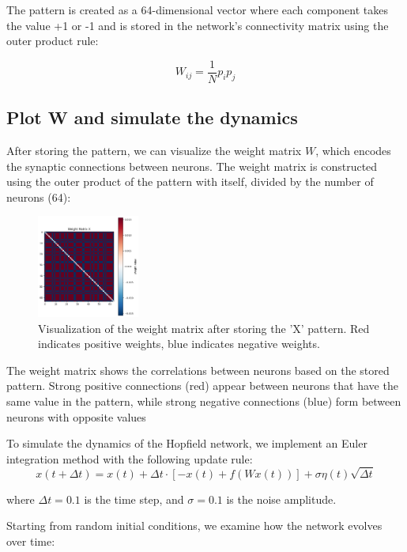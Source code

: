 \documentclass{article}
\begin{document}
The pattern is created as a 64-dimensional vector where each component takes the value +1 or -1 and is stored in the network's connectivity matrix using the outer product rule:

\begin{equation}
W_{ij} = \frac{1}{N}p_i p_j
\end{equation}

\subsection{Plot W and simulate the dynamics}
After storing the pattern, we can visualize the weight matrix $W$, which encodes the synaptic connections between neurons. The weight matrix is constructed using the outer product of the pattern with itself, divided by the number of neurons (64):

\begin{figure}[H]
\centering
\includegraphics[width=0.3\textwidth]{Weight Matrix X.png}
\caption{Visualization of the weight matrix after storing the 'X' pattern. Red indicates positive weights, blue indicates negative weights.}
\label{fig:weight_matrix}
\end{figure}

The weight matrix shows the correlations between neurons based on the stored pattern. Strong positive connections (red) appear between neurons that have the same value in the pattern, while strong negative connections (blue) form between neurons with opposite values

To simulate the dynamics of the Hopfield network, we implement an Euler integration method with the following update rule:
\begin{equation}
x(t+\Delta t) = x(t) + \Delta t \cdot [-x(t) + f(Wx(t))] + \sigma\eta(t)\sqrt{\Delta t}
\end{equation}

where $\Delta t = 0.1$ is the time step, and $\sigma = 0.1$ is the noise amplitude.

Starting from random initial conditions, we examine how the network evolves over time:
\end{document}
